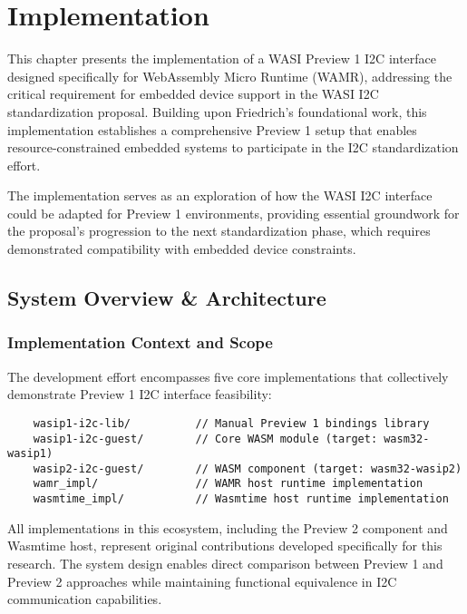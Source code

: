 \chapter{Implementation}
\label{chap:implementation}

This chapter presents the implementation of a WASI Preview 1 I2C interface designed specifically for WebAssembly Micro Runtime (WAMR), addressing the critical requirement for embedded device support in the WASI I2C standardization proposal. Building upon Friedrich's foundational work, this implementation establishes a comprehensive Preview 1 setup that enables resource-constrained embedded systems to participate in the I2C standardization effort.

The implementation serves as an exploration of how the WASI I2C interface could be adapted for Preview 1 environments, providing essential groundwork for the proposal's progression to the next standardization phase, which requires demonstrated compatibility with embedded device constraints.

\section{System Overview \& Architecture}
\label{sec:system-overview}

\subsection{Implementation Context and Scope}

The development effort encompasses five core implementations that collectively demonstrate Preview 1 I2C interface feasibility:

\begin{verbatim}
    wasip1-i2c-lib/          // Manual Preview 1 bindings library
    wasip1-i2c-guest/        // Core WASM module (target: wasm32-wasip1)
    wasip2-i2c-guest/        // WASM component (target: wasm32-wasip2)
    wamr_impl/               // WAMR host runtime implementation
    wasmtime_impl/           // Wasmtime host runtime implementation
\end{verbatim}

All implementations in this ecosystem, including the Preview 2 component and Wasmtime host, represent original contributions developed specifically for this research. The system design enables direct comparison between Preview 1 and Preview 2 approaches while maintaining functional equivalence in I2C communication capabilities.

